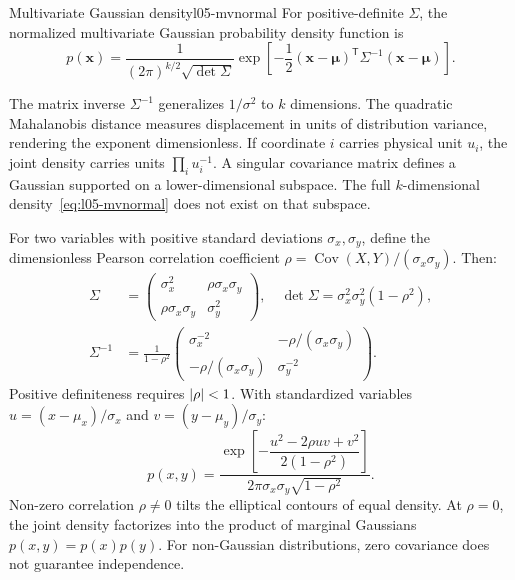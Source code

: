 \begin{definition}{Multivariate Gaussian density}{l05-mvnormal}
For positive-definite $\Sigma$, the normalized multivariate Gaussian probability density function is
\begin{equation}
p(\mathbf x)=\frac1{(2\pi)^{k/2}\sqrt{\det\Sigma}}
\exp\left[-\frac12(\mathbf x-\boldsymbol\mu)^{\mathsf T}
\Sigma^{-1}(\mathbf x-\boldsymbol\mu)\right].
\label{eq:l05-mvnormal}
\end{equation}
\end{definition}
The matrix inverse $\Sigma^{-1}$ generalizes $1/\sigma^2$ to $k$ dimensions. The quadratic Mahalanobis distance measures displacement in units of distribution variance, rendering the exponent dimensionless. If coordinate $i$ carries physical unit $u_i$, the joint density carries units $\prod_i u_i^{-1}$. A singular covariance matrix defines a Gaussian supported on a lower-dimensional subspace. The full $k$-dimensional density~\eqref{eq:l05-mvnormal} does not exist on that subspace.

For two variables with positive standard deviations $\sigma_x,\sigma_y$, define the dimensionless Pearson correlation coefficient $\rho=\operatorname{Cov}(X,Y)/(\sigma_x\sigma_y)$. Then:
\begin{align}
\Sigma&=\begin{pmatrix}\sigma_x^2&\rho\sigma_x\sigma_y\\
\rho\sigma_x\sigma_y&\sigma_y^2\end{pmatrix},
\quad \det\Sigma=\sigma_x^2\sigma_y^2(1-\rho^2),\label{eq:l05-bivariate-cov}\\
\Sigma^{-1}&=\frac1{1-\rho^2}
\begin{pmatrix}\sigma_x^{-2}&-\rho/(\sigma_x\sigma_y)\\
-\rho/(\sigma_x\sigma_y)&\sigma_y^{-2}\end{pmatrix}.
\label{eq:l05-bivariate-inverse}
\end{align}
Positive definiteness requires $\lvert\rho\rvert<1$. With standardized variables $u=(x-\mu_x)/\sigma_x$ and $v=(y-\mu_y)/\sigma_y$:
\begin{equation}
p(x,y)=\frac{\exp\left[-\dfrac{u^2-2\rho uv+v^2}{2(1-\rho^2)}\right]}
{2\pi\sigma_x\sigma_y\sqrt{1-\rho^2}}.
\label{eq:l05-bivariate-density}
\end{equation}
Non-zero correlation $\rho\neq0$ tilts the elliptical contours of equal density. At $\rho=0$, the joint density factorizes into the product of marginal Gaussians $p(x,y)=p(x)p(y)$. For non-Gaussian distributions, zero covariance does not guarantee independence.

